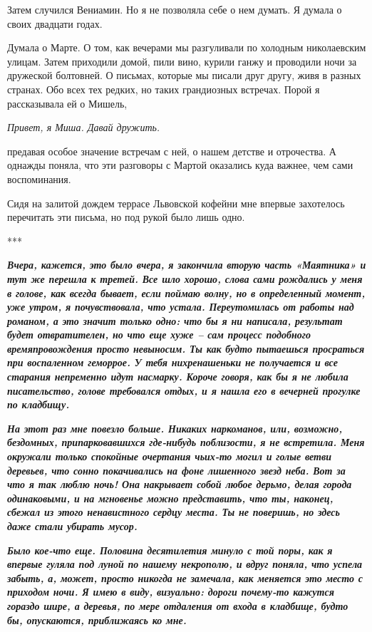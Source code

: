\documentclass[
]{book}
\begin{document}
Затем случился Вениамин. Но я не позволяла себе о нем думать. Я думала о своих двадцати годах.

Думала о Марте. О том, как вечерами мы разгуливали по холодным николаевским улицам. Затем приходили домой, пили вино, курили ганжу и проводили ночи за дружеской болтовней. О письмах, которые мы писали друг другу, живя в разных странах. Обо всех тех редких, но таких грандиозных встречах. Порой я рассказывала ей о Мишель,

\emph{Привет, я Миша. Давай дружить.}

предавая особое значение встречам с ней, о нашем детстве и отрочества. А однажды поняла, что эти разговоры с Мартой оказались куда важнее, чем сами воспоминания.

Сидя на залитой дождем террасе Львовской кофейни мне впервые захотелось перечитать эти письма, но под рукой было лишь одно.

***

\textbf{\emph{
Вчера, кажется, это было вчера, я закончила вторую часть «Маятника» и тут же перешла к третей. Все шло хорошо, слова сами рождались у меня в голове, как всегда бывает, если поймаю волну, но в определенный момент, уже утром, я почувствовала, что устала. Переутомилась от работы над романом, а это значит только одно: что бы я ни написала, результат будет отвратителен, но что еще хуже -- сам процесс подобного времяпровождения просто невыносим. Ты как будто пытаешься просраться при воспаленном геморрое. У тебя нихренашеньки не получается и все старания непременно идут насмарку. Короче говоря, как бы я не любила писательство, голове требовался отдых, и я нашла его в вечерней прогулке по кладбищу.
}}

\textbf{\emph{
На этот раз мне повезло больше. Никаких наркоманов, или, возможно, бездомных, припарковавшихся где-нибудь поблизости, я не встретила. Меня окружали только спокойные очертания чьих-то могил и голые ветви деревьев, что сонно покачивались на фоне лишенного звезд неба. Вот за что я так люблю ночь! Она накрывает собой любое дерьмо, делая города одинаковыми, и на мгновенье можно представить, что ты, наконец, сбежал из этого ненавистного сердцу места. Ты не поверишь, но здесь даже стали убирать мусор.
}}

\textbf{\emph{
Было кое-что еще. Половина десятилетия минуло с той поры, как я впервые гуляла под луной по нашему некрополю, и вдруг поняла, что успела забыть, а, может, просто никогда не замечала, как меняется это место с приходом ночи. Я имею в виду, визуально: дороги почему-то кажутся гораздо шире, а деревья, по мере отдаления от входа в кладбище, будто бы, опускаются, приближаясь ко мне.
}}
\end{document}
